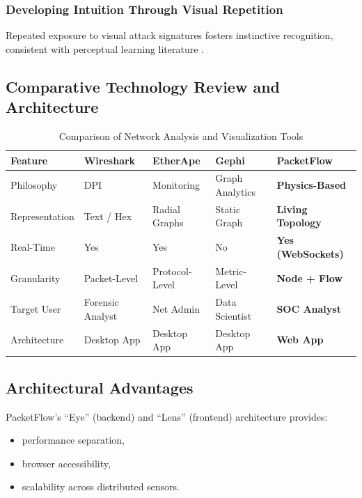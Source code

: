 \documentclass[
    11pt, 
    a4paper, 
    parskip=half, 
    headsepline,       %
    DIV=12             %
]{scrartcl}
\begin{document}
\subsubsection{Developing Intuition Through Visual Repetition}
Repeated exposure to visual attack signatures fosters instinctive recognition, consistent with perceptual learning literature \cite{ref53}.

\subsection{Comparative Technology Review and Architecture}

\begin{table}[h]
    \centering
    \renewcommand{\arraystretch}{1.4} %
    \caption{Comparison of Network Analysis and Visualization Tools}
    \small %
    \begin{tabularx}{\linewidth}{@{} lXXXX @{}}
        \toprule
        \textbf{\color{pfBlue} Feature} & \textbf{\color{pfBlue} Wireshark} & \textbf{\color{pfBlue} EtherApe} & \textbf{\color{pfBlue} Gephi} & \textbf{\color{pfBlue} PacketFlow} \\
        \midrule
        Philosophy & DPI & Monitoring & Graph Analytics & \textbf{Physics-Based} \\
        Representation & Text / Hex & Radial Graphs & Static Graph & \textbf{Living Topology} \\
        Real-Time & Yes & Yes & No & \textbf{Yes (WebSockets)} \\
        Granularity & Packet-Level & Protocol-Level & Metric-Level & \textbf{Node + Flow} \\
        Target User & Forensic Analyst & Net Admin & Data Scientist & \textbf{SOC Analyst} \\
        Architecture & Desktop App & Desktop App & Desktop App & \textbf{Web App} \\
        \bottomrule
    \end{tabularx}
\end{table}

\subsection{Architectural Advantages}
PacketFlow's ``Eye'' (backend) and ``Lens'' (frontend) architecture provides:
\begin{itemize}
    \item performance separation,
    \item browser accessibility,
    \item scalability across distributed sensors.
\end{itemize}
\end{document}
